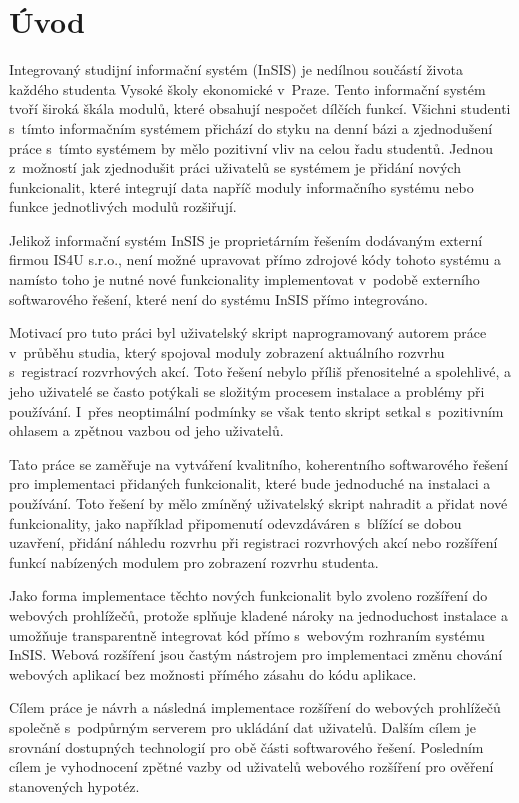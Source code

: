 \chapter*{Úvod}

Integrovaný studijní informační systém (InSIS) je nedílnou součástí života každého studenta Vysoké školy ekonomické v~Praze. Tento informační systém tvoří široká škála modulů, které obsahují nespočet dílčích funkcí. Všichni studenti s~tímto informačním systémem přichází do styku na denní bázi a zjednodušení práce s~tímto systémem by mělo pozitivní vliv na celou řadu studentů. Jednou z~možností jak zjednodušit práci uživatelů se systémem je přidání nových funkcionalit, které integrují data napříč moduly informačního systému nebo funkce jednotlivých modulů rozšiřují. 

Jelikož informační systém InSIS je proprietárním řešením dodávaným externí firmou IS4U s.r.o., není možné upravovat přímo zdrojové kódy tohoto systému a namísto toho je nutné nové funkcionality implementovat v~podobě externího softwarového řešení, které není do systému InSIS přímo integrováno. 

Motivací pro tuto práci byl uživatelský skript naprogramovaný autorem práce v~průběhu studia, který spojoval moduly zobrazení aktuálního rozvrhu s~registrací rozvrhových akcí. Toto řešení nebylo příliš přenositelné a spolehlivé, a jeho uživatelé se často potýkali se složitým procesem instalace a problémy při používání. I~přes neoptimální podmínky se však tento skript setkal s~pozitivním ohlasem a zpětnou vazbou od jeho uživatelů.

Tato práce se zaměřuje na vytváření kvalitního, koherentního softwarového řešení pro implementaci přidaných funkcionalit, které bude jednoduché na instalaci a používání. Toto řešení by mělo zmíněný uživatelský skript nahradit a přidat nové funkcionality, jako například připomenutí odevzdáváren s~blížící se dobou uzavření, přidání náhledu rozvrhu při registraci rozvrhových akcí nebo rozšíření funkcí nabízených modulem pro zobrazení rozvrhu studenta. 

Jako forma implementace těchto nových funkcionalit bylo zvoleno rozšíření do webových prohlížečů, protože splňuje kladené nároky na jednoduchost instalace a umožňuje transparentně integrovat kód přímo s~webovým rozhraním systému InSIS. Webová rozšíření jsou častým nástrojem pro implementaci změnu chování webových aplikací bez možnosti přímého zásahu do kódu aplikace. 

Cílem práce je návrh a následná implementace rozšíření do webových prohlížečů společně s~podpůrným serverem pro ukládání dat uživatelů. Dalším cílem je srovnání dostupných technologií pro obě části softwarového řešení. Posledním cílem je vyhodnocení zpětné vazby od uživatelů webového rozšíření pro ověření stanovených hypotéz.

